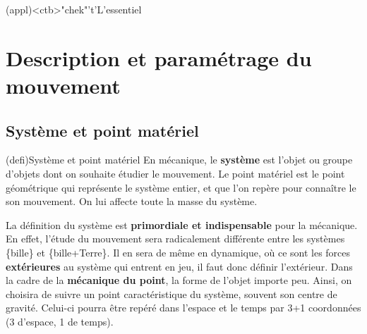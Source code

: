\documentclass[../../main/main.tex]{subfiles}
\begin{document}
\vspace*{\fill}
\newpage
\vspace*{\fill}

\begin{tcn}[%
		sidebyside, fontupper=\small, fontlower=\small
	](appl)<ctb>"chek"'t'{L'essentiel}
	\tcblower
\end{tcn}

\vspace*{\fill}

\newpage

%

\section{Description et paramétrage du mouvement}
\subsection{Système et point matériel}
\begin{tcb}(defi){Système et point matériel}
	En mécanique, le \textbf{système} est l'objet ou groupe
	d'objets dont on souhaite étudier le mouvement.
	\smallbreak
	Le point matériel est le point géométrique qui représente le système entier,
	et que l'on repère pour connaître le son mouvement. On lui affecte toute la
	masse du système.
\end{tcb}

La définition du système est \textbf{primordiale et indispensable} pour la
mécanique. En effet, l'étude du mouvement sera radicalement différente entre les
systèmes \{bille\} et \{bille+Terre\}. Il en sera de même en dynamique, où ce
sont les forces \textbf{extérieures} au système qui entrent en jeu, il faut donc
définir l'extérieur.
\bigbreak
Dans la cadre de la \textbf{mécanique du point}, la forme de l'objet importe
peu. Ainsi, on choisira de suivre un point caractéristique du système, souvent
son centre de gravité. Celui-ci pourra être repéré dans l'espace et le temps par
3+1 coordonnées (3 d'espace, 1 de temps).
\end{document}
